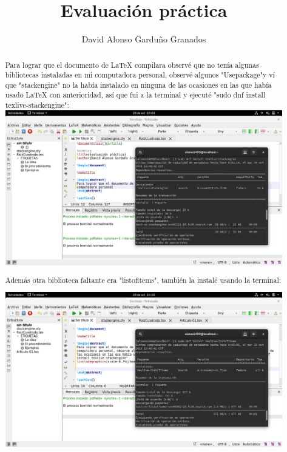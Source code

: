 \documentclass[]{article}
\title{Evaluación práctica}
\author{David Alonso Garduño Granados}
\begin{document}
\maketitle

\begin{abstract}
Para lograr que el documento de LaTeX compilara observé que no tenía algunas bibliotecas instaladas en mi computadora personal, observé algunos "Usepackage"y ví que "stackengine" no la había instalado en ninguna de las ocasiones en las que había usado LaTeX con anterioridad, así que fui a la terminal y ejecuté "sudo dnf install texlive-stackengine":
\includegraphics[scale=0.20]{Imagenes/Stackengine.png}

Además otra biblioteca faltante era "listofitems", también la instalé usando la terminal:

\includegraphics[scale=0.20]{Imagenes/2da.png}
\end{abstract}
\end{document}
